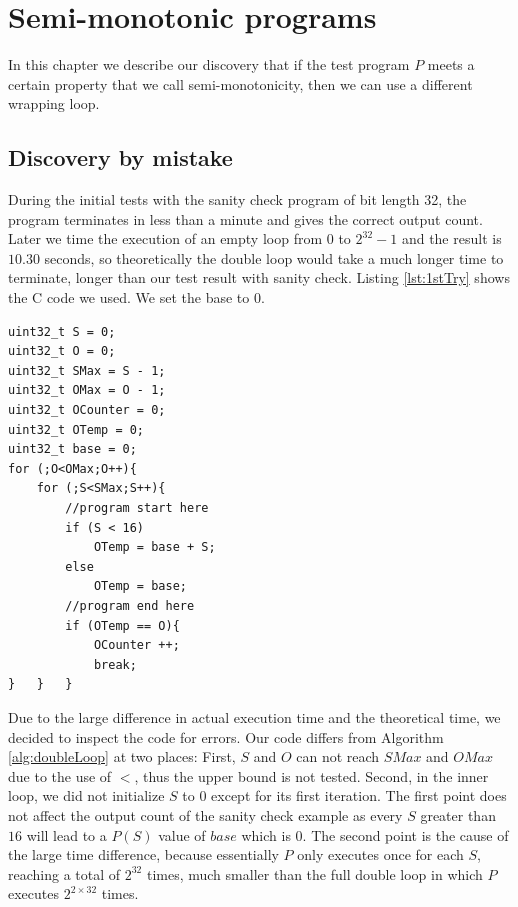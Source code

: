 
\chapter{Semi-monotonic programs}
	\label{CH_03}

In this chapter we describe our discovery that if the test program $P$ meets a certain property that we call semi-monotonicity, then we can use a different wrapping loop. 

\section{Discovery by mistake}
During the initial tests with the sanity check program of bit length 32, the program terminates in less than a minute and gives the correct output count. Later we time the execution of an empty loop from $0$ to $2^{32} - 1$ and the result is $10.30$ seconds, so theoretically the double loop would take a much longer time to terminate, longer than our test result with sanity check.  Listing \ref{lst:1stTry} shows the C code we used. We set the base to 0.

\lstset{language=C}  
\begin{lstlisting}[float=!h, caption={Initial implementation of the double loop with sanity check in C.},label=lst:1stTry]
uint32_t S = 0;
uint32_t O = 0;
uint32_t SMax = S - 1;
uint32_t OMax = O - 1;
uint32_t OCounter = 0;
uint32_t OTemp = 0;
uint32_t base = 0;
for (;O<OMax;O++){
	for (;S<SMax;S++){
		//program start here
		if (S < 16)
			OTemp = base + S;
		else
			OTemp = base;
		//program end here
		if (OTemp == O){
			OCounter ++;
			break;
}	}	}
\end{lstlisting}

Due to the large difference in actual execution time and the theoretical time, we decided to inspect the code for errors. Our code differs from Algorithm \ref{alg:doubleLoop} at two places: First, $S$ and $O$ can not reach $SMax$ and $OMax$ due to the use of $<$, thus the upper bound is not tested. Second, in the inner loop, we did not initialize $S$ to $0$ except for its first iteration. The first point does not affect the output count of the sanity check example as every $S$ greater than $16$ will lead to a $P(S)$ value of $base$ which is $0$. The second point is the cause of the large time difference, because essentially $P$ only executes once for each $S$, reaching a total of $2^{32}$ times, much smaller than the full double loop in which $P$ executes $2^{2 \times 32}$ times.

